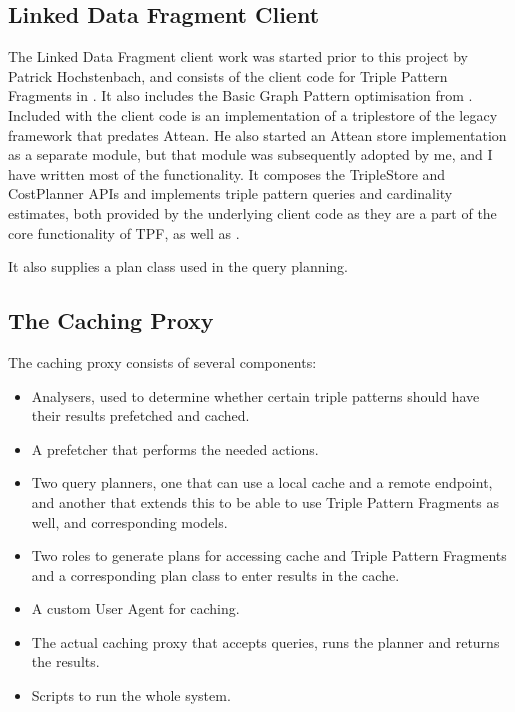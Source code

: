 \subsection{Linked Data Fragment Client}\label{sec:ldfclient}

The Linked Data Fragment client work was started prior to this project
by Patrick Hochstenbach, and consists of the client code for Triple
Pattern Fragments in . It also includes the Basic
Graph Pattern optimisation from \cite{verborgh2014querying}. Included with the client
code is an implementation of a triplestore of the legacy
 framework that predates Attean. He also started
an Attean store implementation  as a
separate module, but that module was subsequently adopted by me, and I
have written most of the functionality. It composes the TripleStore
and CostPlanner APIs and implements triple pattern queries and
cardinality estimates, both provided by the underlying client code as
they are a part of the core functionality of TPF,
as well as .

It also supplies a plan class 
used in the query planning. 

\subsection{The Caching Proxy}\label{sec:cacher}

The caching proxy consists of several components:

\begin{itemize}
\item Analysers, used to determine whether certain triple patterns
  should have their results prefetched and cached.
\item A prefetcher that performs the needed actions.
\item Two query planners, one that can use a local cache and a remote
  endpoint, and another that extends this to be able to use Triple
  Pattern Fragments as well, and corresponding models.
\item Two roles to generate plans for accessing cache and Triple
  Pattern Fragments and a corresponding plan class to enter results
  in the cache.
\item A custom User Agent for caching.
\item The actual caching proxy that accepts queries, runs the planner
  and returns the results.
\item Scripts to run the whole system.
\end{itemize}

